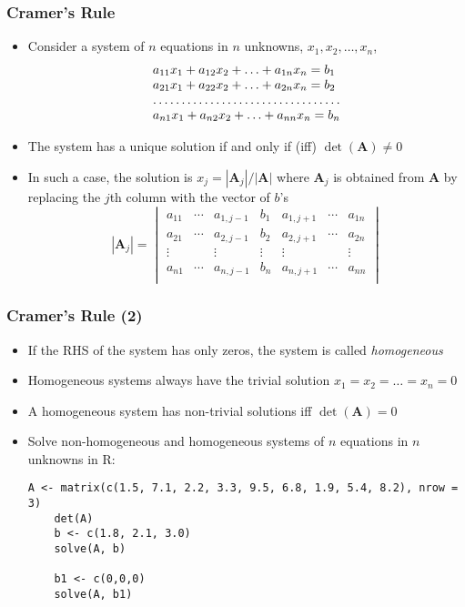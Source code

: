 \documentclass[10pt]{beamer}
\theoremstyle{definition}
\begin{document}
\begin{frame}[fragile]
\frametitle{Cramer's Rule}
\begin{itemize}
	\item Consider a system of $n$ equations in $n$ unknowns, $x_{1},x_{2},\ldots,x_{n}$,
	\[
		\begin{array}{lcl}
			a_{11}x_{1} + a_{12}x_{2} + \ldots + a_{1n}x_{n} = b_{1}\\
			a_{21}x_{1} + a_{22}x_{2} + \ldots + a_{2n}x_{n} = b_{2}\\
			\hdotsfor{1}\\
			a_{n1}x_{1} + a_{n2}x_{2} + \ldots + a_{nn}x_{n} = b_{n}\\
		\end{array}
	\]
	\item The system has a unique solution if and only if (iff) $\det(\mathbf{A}) \neq 0$
	\item In such a case, the solution is $x_{j} = |\mathbf{A}_{j}|/|\mathbf{A}|$ where $\mathbf{A}_{j}$ is obtained from $\mathbf{A}$ by replacing the $j$th column with the vector of $b$'s
	\[
		|\mathbf{A}_{j}| = 
		\begin{vmatrix}
			a_{11} & \cdots & a_{1,j-1} & b_{1} & a_{1,j + 1} & \cdots & a_{1n}\\
			a_{21} & \cdots & a_{2,j-1} & b_{2} & a_{2,j + 1} & \cdots & a_{2n}\\
			\vdots & & \vdots & \vdots & \vdots & & \vdots\\ 
			a_{n1} & \cdots & a_{n,j-1} & b_{n} & a_{n,j + 1} & \cdots & a_{nn}\\
		\end{vmatrix}
	\]
\end{itemize}
\end{frame}

\begin{frame}[fragile]
\frametitle{Cramer's Rule (2)}
\begin{itemize}
	\item If the RHS of the system has only zeros, the system is called  \textit{homogeneous}
	\item Homogeneous systems always have the trivial solution $x_{1} = x_{2} = \ldots = x_{n} = 0$
	\item A homogeneous system has non-trivial solutions iff $\det(\mathbf{A}) = 0$
	\item Solve non-homogeneous and homogeneous systems of $n$ equations in $n$ unknowns in R:
	\begin{lstlisting}[style = rstyle, breaklines]
	A <- matrix(c(1.5, 7.1, 2.2, 3.3, 9.5, 6.8, 1.9, 5.4, 8.2), nrow = 3)
	det(A)
	b <- c(1.8, 2.1, 3.0)
	solve(A, b)

	b1 <- c(0,0,0)
	solve(A, b1)	
	\end{lstlisting}
\end{itemize}
\end{frame}
\end{document}
